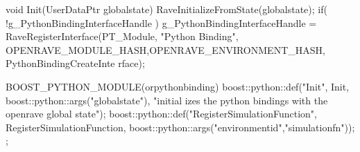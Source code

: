 \begin{DoxyCodeInclude}
void Init(UserDataPtr globalstate)
{
    RaveInitializeFromState(globalstate);
    if( !g_PythonBindingInterfaceHandle ) {
        g_PythonBindingInterfaceHandle = RaveRegisterInterface(PT_Module, "Python
      Binding", OPENRAVE_MODULE_HASH,OPENRAVE_ENVIRONMENT_HASH, PythonBindingCreateInte
      rface);
    }
}

BOOST_PYTHON_MODULE(orpythonbinding)
{
    boost::python::def("Init", Init, boost::python::args("globalstate"), "initial
      izes the python bindings with the openrave global state");
    boost::python::def("RegisterSimulationFunction", RegisterSimulationFunction, 
      boost::python::args("environmentid","simulationfn"));
};
\end{DoxyCodeInclude}
 